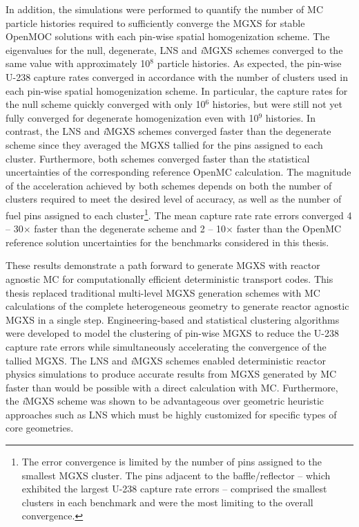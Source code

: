 In addition, the simulations were performed to quantify the number of \ac{MC} particle histories required to sufficiently converge the \ac{MGXS} for stable OpenMOC solutions with each pin-wise spatial homogenization scheme. The eigenvalues for the null, degenerate, \ac{LNS} and \textit{i}\ac{MGXS} schemes converged to the same value with approximately 10$^{8}$ particle histories. As expected, the pin-wise U-238 capture rates converged in accordance with the number of clusters used in each pin-wise spatial homogenization scheme. In particular, the capture rates for the null scheme quickly converged with only 10$^{6}$ histories, but were still not yet fully converged for degenerate homogenization even with 10$^{9}$ histories. In contrast, the \ac{LNS} and \textit{i}\ac{MGXS} schemes converged faster than the degenerate scheme since they averaged the \ac{MGXS} tallied for the pins assigned to each cluster. Furthermore, both schemes converged faster than the statistical uncertainties of the corresponding reference OpenMC calculation. The magnitude of the acceleration achieved by both schemes depends on both the number of clusters required to meet the desired level of accuracy, as well as the number of fuel pins assigned to each cluster\footnote{The error convergence is limited by the number of pins assigned to the smallest \ac{MGXS} cluster. The pins adjacent to the baffle/reflector -- which exhibited the largest U-238 capture rate errors -- comprised the smallest clusters in each benchmark and were the most limiting to the overall convergence.}. The mean capture rate rate errors converged 4 -- 30$\times$ faster than the degenerate scheme and 2 -- 10$\times$ faster than the OpenMC reference solution uncertainties for the benchmarks considered in this thesis.



These results demonstrate a path forward to generate \ac{MGXS} with reactor agnostic \ac{MC} for computationally efficient deterministic transport codes. This thesis replaced traditional multi-level \ac{MGXS} generation schemes with \ac{MC} calculations of the complete heterogeneous geometry to generate reactor agnostic \ac{MGXS} in a single step. Engineering-based and statistical clustering algorithms were developed to model the clustering of pin-wise \ac{MGXS} to reduce the U-238 capture rate errors while simultaneously accelerating the convergence of the tallied \ac{MGXS}. The \ac{LNS} and \textit{i}\ac{MGXS} schemes enabled deterministic reactor physics simulations to produce accurate results from \ac{MGXS} generated by \ac{MC} faster than would be possible with a direct calculation with \ac{MC}. Furthermore, the \textit{i}\ac{MGXS} scheme was shown to be advantageous over geometric heuristic approaches such as \ac{LNS} which must be highly customized for specific types of core geometries.

